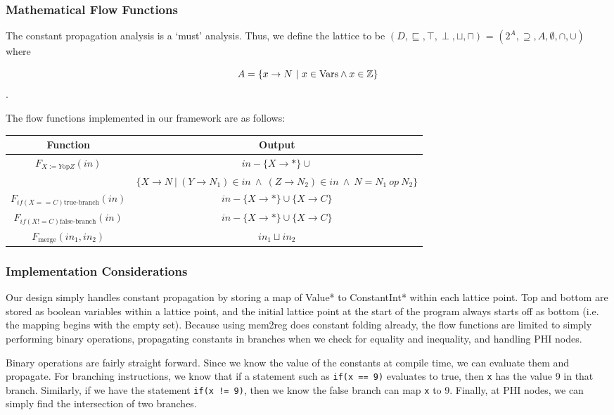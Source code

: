 \documentclass{article}
\theoremstyle{definition}
\begin{document}
\subsubsection{Mathematical Flow Functions}

The constant propagation analysis is a `must' analysis. Thus, we define the lattice to be $(D, \sqsubseteq, \top, \perp, \sqcup, \sqcap)$ = $(2^A, \supseteq, A, \emptyset, \cap, \cup)$ where

\[ A = \{x \rightarrow N~|~x \in \textup{Vars} \wedge x \in \mathbb{Z}\} \].

The flow functions implemented in our framework are as follows:

\begin{center}
\begin{tabular}{c | c} %
Function & Output \\ [0.5ex] %
\hline %
$F_{X:= Y \text{op} Z}(in)$ & $in - \{X \rightarrow \ast\} \cup$\\
& $\{ X \rightarrow N~|~(Y \rightarrow N_1) \in in~\wedge ~(Z \rightarrow N_2) \in in~\wedge ~N = N_1~op~N_2 \}$ \\ %
$F_{if(X == C) \text{true-branch}}(in)$ & $in - \{X \rightarrow \ast\} \cup \{ X \rightarrow C \}$ \\ 
$F_{if(X != C) \text{false-branch}}(in)$ & $in - \{X \rightarrow \ast\} \cup \{ X \rightarrow C \}$ \\ 
$F_{\text{merge}}(in_1, in_2)$ & $in_1 \sqcup in_2$\\
 [1ex] %
\hline %
\end{tabular} 
\end{center}

\subsubsection{Implementation Considerations}

Our design simply handles constant propagation by storing a map of Value* to ConstantInt* within each lattice point. Top and bottom are stored as boolean variables within a lattice point, and the initial lattice point at the start of the program always starts off as bottom (i.e. the mapping begins with the empty set). Because using mem2reg does constant folding already, the flow functions are limited to simply performing binary operations, propagating constants in branches when we check for equality and inequality, and handling PHI nodes.

Binary operations are fairly straight forward. Since we know the value of the constants at compile time, we can evaluate them and propagate. For branching instructions, we know that if a statement such as \verb|if(x == 9)| evaluates to true, then \verb|x| has the value 9 in that branch. Similarly, if we have the statement \verb|if(x != 9)|, then we know the false branch can map \verb|x| to 9. Finally, at PHI nodes, we can simply find the intersection of two branches.
\end{document}
